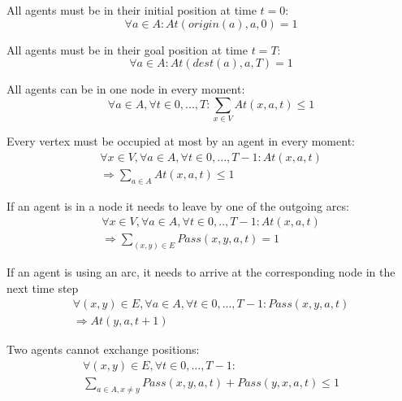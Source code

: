 \documentclass[12pt, a4paper, hidelinks]{article}
\numberwithin{equation}{section}
\begin{document}
\begin{description}\label{equation_set_1}
\item All agents must be in their initial position at time $t = 0$:
\begin{equation}
\forall a \in A: At(origin(a), a, 0) = 1
\label{eq:1.1}\end{equation}

\item All agents must be in their goal position at time $t = T$:
\begin{equation}
\forall a \in A : At(dest(a), a, T) = 1
\label{eq:1.2}\end{equation}

\item All agents can be in one node in every moment:
\begin{equation}
\forall a \in A, \forall t \in {0,...,T}: \displaystyle\sum_{x \in V}At(x,a,t)\leq1
\label{eq:1.3}\end{equation}

\item Every vertex must be occupied at most by an agent in every moment:
\begin{equation}\begin{split}
\forall x \in V, \forall a \in A, \forall t \in {0,...,T-1}: At(x, a, t) \\ 
\Rightarrow \displaystyle\sum_{a \in A}At(x,a,t)\leq1
\end{split}\label{eq:1.4}\end{equation}

\item If an agent is in a node it needs to leave by one of the outgoing arcs:
\begin{equation}\begin{split}
\forall x \in V, \forall a \in A, \forall t \in {0,..,T-1}: At(x,a,t) \\
\Rightarrow  \displaystyle\sum_{(x,y) \in E}Pass(x,y,a,t)=1
\end{split}\label{eq:1.5}\end{equation}

\item If an agent is using an arc, it needs to arrive at the corresponding node in the next time step
\begin{equation}\begin{split}
\forall (x,y) \in E, \forall a \in A, \forall t \in {0,...,T-1}: Pass(x,y,a,t) \\
\Rightarrow At(y,a,t+1)
\end{split}\label{eq:1.6}
\end{equation}

\item Two agents cannot exchange positions:
\begin{equation}\begin{split}
\forall (x,y) \in E, \forall t \in {0,...,T-1}: \\
\displaystyle\sum_{a \in A, x \neq y}Pass(x,y,a,t) + Pass(y,x,a,t) \leq 1
\end{split}\label{eq:1.7}\end{equation}
\end{description}
\end{document}
